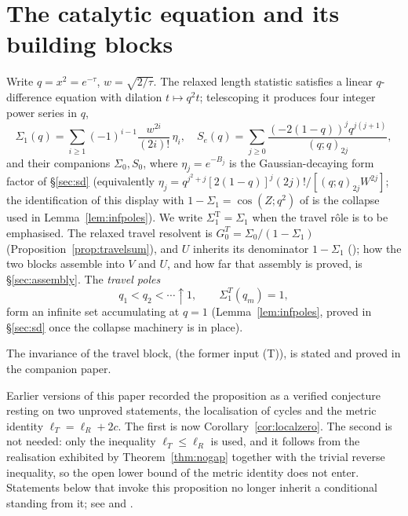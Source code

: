 \documentclass[11pt]{article}
\theoremstyle{plain}
\theoremstyle{definition}
\theoremstyle{remark}
\begin{document}
\section{The catalytic equation and its building blocks}\label{sec:setup}

Write $q=x^2=e^{-\tau}$, $w=\sqrt{2/\tau}$. The relaxed length statistic satisfies a linear
$q$-difference equation with dilation $t\mapsto q^2t$; telescoping it produces four integer power
series in $q$,
\begin{equation}\label{eq:blocks}
  \Sigma_1(q)=\sum_{i\ge1}(-1)^{i-1}\frac{w^{2i}}{(2i)!}\,\eta_i,\quad
  S_e(q)=\sum_{j\ge0}\frac{(-2(1-q))^j q^{j(j+1)}}{(q;q)_{2j}},
\end{equation}
and their companions $\Sigma_0,S_0$, where $\eta_j=e^{-B_j}$ is the Gaussian-decaying form factor
of \S\ref{sec:sd} (equivalently $\eta_j=q^{j^2+j}[2(1-q)]^j(2j)!/[(q;q)_{2j}W^{2j}]$; the
identification of this display with $1-\Sigma_1=\cos(Z;q^2)$ of {\cite[Proposition \textup{prop:qtrig}]{Bonfioli2026bA}} is the
collapse used in Lemma~\ref{lem:infpoles}). We write $\Sigma_1^{\mathrm T}=\Sigma_1$ when the travel
r\^ole is to be emphasised. The relaxed travel resolvent is $G^T_0=\Sigma_0/(1-\Sigma_1)$
(Proposition~\ref{prop:travelsum}), and $U$ inherits its denominator $1-\Sigma_1$
({\cite[Proposition ``Invariance of the travel block'', \textup{prop:travelinv}]{Bonfioli2026bA}}); how the two blocks assemble into $V$ and $U$, and how far that
assembly is proved, is \S\ref{sec:assembly}. The \emph{travel poles}
\[
   q_1<q_2<\cdots\uparrow1,\qquad \Sigma_1^T(q_m)=1,
\]
form an infinite set accumulating at $q=1$ (Lemma~\ref{lem:infpoles}, proved in \S\ref{sec:sd}
once the collapse machinery is in place).

\noindent The invariance of the travel block, {\cite[Proposition ``Invariance of the travel block'', \textup{prop:travelinv}]{Bonfioli2026bA}} (the former input
\textup{(T)}), is stated and proved in the companion paper.

\noindent Earlier versions of this paper recorded the proposition as a verified conjecture resting
on two unproved statements, the localisation of cycles and the metric identity
$\ell_T=\ell_R+2c$. The first is now Corollary~\ref{cor:localzero}. The second is not needed: only
the inequality $\ell_T\le\ell_R$ is used, and it follows from the realisation exhibited by
Theorem~\ref{thm:nogap} together with the trivial reverse inequality, so the open lower bound of the
metric identity does not enter. Statements below that invoke this proposition no longer inherit a
conditional standing from it; see {\cite[Theorem \textup{thm:U}]{Bonfioli2026bA}} and {\cite[Remark \textup{rem:Ustatus}]{Bonfioli2026bA}}.
\end{document}
